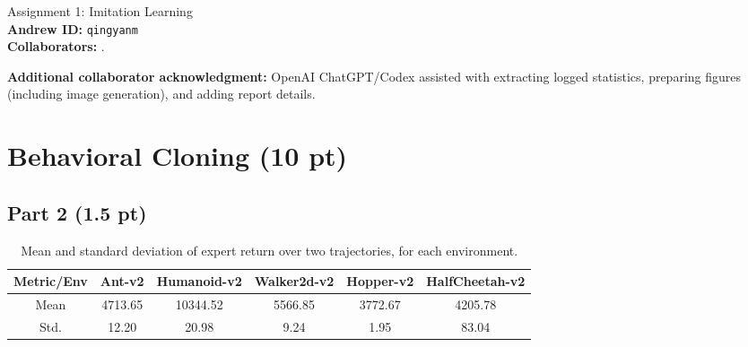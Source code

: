 \documentclass{article}
\begin{document}
\begin{center}
    {\Large Assignment 1: Imitation Learning} \\
    \vspace{.25cm}
    \textbf{Andrew ID:} \texttt{qingyanm} \\
    \textbf{Collaborators:} . \\
\end{center}

\textbf{Additional collaborator acknowledgment:} OpenAI ChatGPT/Codex assisted with extracting logged statistics, preparing figures (including image generation), and adding report details.


\section{Behavioral Cloning (10 pt)}

\subsection{Part 2 (1.5 pt)}
\begin{table}[!h]
  \centering
  \caption{Mean and standard deviation of expert return over two trajectories, for each environment.}
  \begin{tabular}{cccccc}
    \toprule
    Metric/Env & Ant-v2 & Humanoid-v2 & Walker2d-v2 & Hopper-v2 & HalfCheetah-v2 \\
    \midrule
    Mean  & 4713.65 & 10344.52 & 5566.85 & 3772.67 &4205.78\\
    Std.  & 12.20 & 20.98 & 9.24 & 1.95 & 83.04\\
    \bottomrule
  \end{tabular}
  \label{tab:p2}
\end{table}
\end{document}
